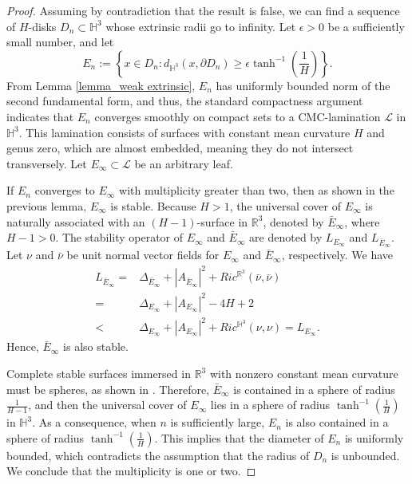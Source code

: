 \documentclass[12pt,a4paper]{amsart}
\numberwithin{equation}{section}
\theoremstyle{plain}
\theoremstyle{named}
\theoremstyle{definition}
\begin{document}
 
\begin{proof}
    Assuming by contradiction that the result is false, we can find a sequence of $H$-disks $D_n\subset \mathbb{H}^3$ whose extrinsic radii go to infinity. Let $\epsilon>0$ be a sufficiently small number, and let \begin{equation*}
        E_n:=\left\{x\in D_n: d_{\mathbb{H}^3}(x,\partial D_n)\geq\epsilon \tanh^{-1}\left(\frac{1}{H}\right)\right\}.
    \end{equation*}
    From Lemma \ref{lemma_weak extrinsic}, $E_n$ has uniformly bounded norm of the second fundamental form, and thus, the standard compactness argument indicates that $E_n$ converges smoothly on compact sets to a CMC-lamination $\mathcal{L}$ in $\mathbb{H}^3$. This lamination consists of surfaces with constant mean curvature $H$ and genus zero, which are almost embedded, meaning they do not intersect transversely. Let $E_\infty\subset \mathcal{L}$ be an arbitrary leaf. 
    
    
    If $E_n$ converges to $E_\infty$ with multiplicity greater than two, then as shown in the previous lemma, $E_\infty$ is stable. Because $H>1$, the universal cover of $E_\infty$ is naturally associated with an $(H-1)$-surface in $\mathbb{R}^3$,  denoted by $\bar{E}_\infty$, where $H-1>0$. 
    The stability operator of $E_\infty$ and $\bar{E}_\infty$ are denoted by $L_{E_\infty}$ and $L_{\bar{E}_\infty}$. Let $\nu$ and $\bar{\nu}$ be unit normal vector fields for $E_\infty$ and $\bar{E}_\infty$, respectively. We have
    \begin{align*}
        L_{\bar{E}_\infty}=& \Delta_{\bar{E}_\infty}+|A_{\bar{E}_\infty}|^2+Ric^{\mathbb{R}^3}(\bar{\nu},\bar{\nu})\\
        =&\Delta_{E_\infty}+|A_{E_\infty}|^2-4H+2\\
        <& \Delta_{E_\infty}+|A_{E_\infty}|^2+Ric^{\mathbb{H}^3}(\nu,\nu)=L_{E_\infty}.
    \end{align*}
    Hence, $\bar{E}_\infty$ is also stable. 
    
    Complete stable surfaces immersed in $\mathbb{R}^3$ with nonzero constant mean curvature must be spheres, as shown in \cite{Barbosa-doCarmo}. Therefore, $\bar{E}_\infty$ is contained in a sphere of radius $\frac{1}{H-1}$, and then the universal cover of $E_\infty$ lies in a sphere of radius $\tanh^{-1}\left(\frac{1}{H}\right)$ in $\mathbb{H}^3$. As a consequence, when $n$ is sufficiently large,  $E_n$ is also contained in a sphere of radius $\tanh^{-1}\left(\frac{1}{H}\right)$. This implies that the diameter of $E_n$ is uniformly bounded, which contradicts the assumption that the radius of $D_n$ is unbounded. We conclude that the multiplicity is one or two.


\end{proof}
\end{document}
